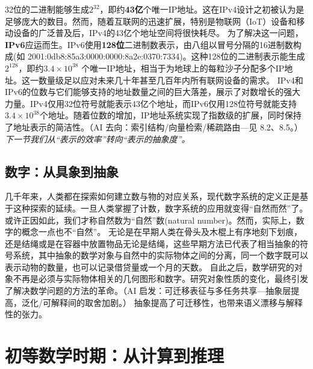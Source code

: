 
32位的二进制能够生成$2^{32}$，即约{\bf 43亿}个唯一IP地址。这在IPv4设计之初被认为是足够庞大的数目。然而，随着互联网的迅速扩展，特别是物联网（IoT）设备和移动设备的广泛普及后，IPv4的43亿个地址空间将很快耗尽。
   为了解决这一问题，{\bf IPv6}应运而生。IPv6使用{\bf 128位}二进制数表示，由八组以冒号分隔的16进制数构成(如 2001:0db8:85a3:0000:0000:8a2e:0370:7334)。这种128位的二进制表示能生成$2^{128}$，即约{\bf $3.4 \times 10^{38} $} 个唯一IP地址，相当于为地球上的每粒沙子分配多个IP地址。这一数量级足以应对未来几十年甚至几百年内所有联网设备的需求。
IPv4和IPv6的位数与它们能够支持的地址数量之间的巨大落差，展示了对数增长的强大力量。IPv4仅用32位符号就能表示43亿个地址，而IPv6仅用128位符号就能支持{\bf $3.4 \times 10^{38}$}个地址。随着位数的增加，IP地址系统实现了指数级的扩展，同时保持了地址表示的简洁性。{（AI 去向：索引结构/向量检索/稀疏路由—见 8.2、8.5。）}
\emph{下一节我们从“表示的效率”转向“表示的抽象度”。}
\subsection{数字：从具象到抽象}


几千年来，人类都在探索如何建立数与物的对应关系，现代数字系统的定义正是基于这种探索的延续。一旦人类掌握了计数，数字系统的应用就变得“自然而然”了。或许正因如此，我们才称自然数为“自然”数(natural number)。然而，实际上，数字的概念一点也不“自然”。
无论是在早期人类在骨头及木棍上有序地刻下划痕，还是结绳或是在容器中放置物品无论是结绳，这些早期方法已代表了相当抽象的符号系统，其中抽象的数学对象与自然中的实际物体之间的分离，同一个数字既可以表示动物的数量，也可以记录借贷量或一个月的天数。
自此之后，数学研究的对象不再是必须与实际物体相关的几何图形和数字。研究对象性质的变化，最终引发了解决数学问题的方法的革命。{（AI 启发：可迁移表征与多任务共享—抽象层提高，泛化/可解释间的取舍加剧。）}
抽象提高了可迁移性，也带来语义漂移与解释性的张力。

\section{初等数学时期：从计算到推理}


